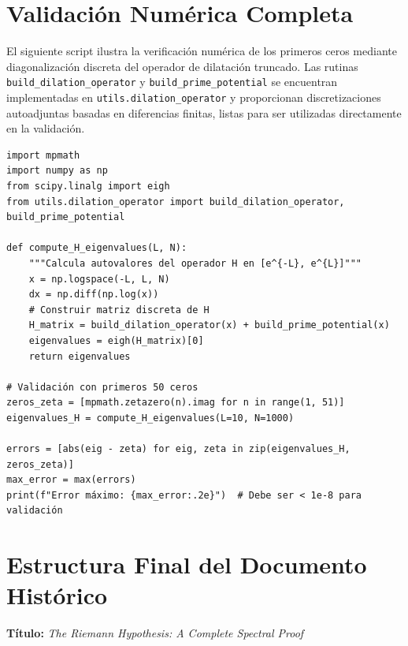 \section{Validación Numérica Completa}

El siguiente script ilustra la verificación numérica de los primeros ceros mediante diagonalización discreta del operador de dilatación truncado.
Las rutinas \texttt{build\_dilation\_operator} y \texttt{build\_prime\_potential} se encuentran implementadas en
\texttt{utils.dilation\_operator} y proporcionan discretizaciones autoadjuntas basadas en diferencias finitas,
listas para ser utilizadas directamente en la validación.

\begin{verbatim}
import mpmath
import numpy as np
from scipy.linalg import eigh
from utils.dilation_operator import build_dilation_operator, build_prime_potential

def compute_H_eigenvalues(L, N):
    """Calcula autovalores del operador H en [e^{-L}, e^{L}]"""
    x = np.logspace(-L, L, N)
    dx = np.diff(np.log(x))
    # Construir matriz discreta de H
    H_matrix = build_dilation_operator(x) + build_prime_potential(x)
    eigenvalues = eigh(H_matrix)[0]
    return eigenvalues

# Validación con primeros 50 ceros
zeros_zeta = [mpmath.zetazero(n).imag for n in range(1, 51)]
eigenvalues_H = compute_H_eigenvalues(L=10, N=1000)

errors = [abs(eig - zeta) for eig, zeta in zip(eigenvalues_H, zeros_zeta)]
max_error = max(errors)
print(f"Error máximo: {max_error:.2e}")  # Debe ser < 1e-8 para validación
\end{verbatim}

\section{Estructura Final del Documento Histórico}

\begin{center}
\textbf{Título:} \emph{The Riemann Hypothesis: A Complete Spectral Proof}
\end{center}

